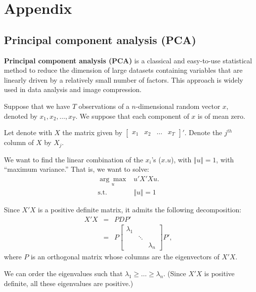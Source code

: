 \documentclass[
  12pt,
]{book}
\theoremstyle{definition}
\theoremstyle{definition}
\theoremstyle{definition}
\theoremstyle{definition}
\theoremstyle{remark}
\begin{document}
\hypertarget{append}{%
\chapter{Appendix}\label{append}}

\hypertarget{PCAapp}{%
\section{Principal component analysis (PCA)}\label{PCAapp}}

\textbf{Principal component analysis (PCA)} is a classical and easy-to-use statistical method to reduce the dimension of large datasets containing variables that are linearly driven by a relatively small number of factors. This approach is widely used in data analysis and image compression.

Suppose that we have \(T\) observations of a \(n\)-dimensional random vector \(x\), denoted by \(x_{1},x_{2},\ldots,x_{T}\). We suppose that each component of \(x\) is of mean zero.

Let denote with \(X\) the matrix given by \(\left[\begin{array}{cccc} x_{1} & x_{2} & \ldots & x_{T}\end{array}\right]'\). Denote the \(j^{th}\) column of \(X\) by \(X_{j}\).

We want to find the linear combination of the \(x_{i}\)'s (\(x.u\)), with \(\left\Vert u\right\Vert =1\), with ``maximum variance.'' That is, we want to solve:
\begin{equation}
\begin{array}{clll}
\underset{u}{\arg\max} & u'X'Xu. \\
\mbox{s.t. } & \left\Vert u \right\Vert =1
\end{array}\label{eq:PCA11}
\end{equation}

Since \(X'X\) is a positive definite matrix, it admits the following decomposition:
\begin{eqnarray*}
X'X & = & PDP'\\
& = & P\left[\begin{array}{ccc}
\lambda_{1}\\
& \ddots\\
&  & \lambda_{n}
\end{array}\right]P',
\end{eqnarray*}
where \(P\) is an orthogonal matrix whose columns are the eigenvectors of \(X'X\).

We can order the eigenvalues such that \(\lambda_{1}\geq\ldots\geq\lambda_{n}\). (Since \(X'X\) is positive definite, all these eigenvalues are positive.)
\end{document}
